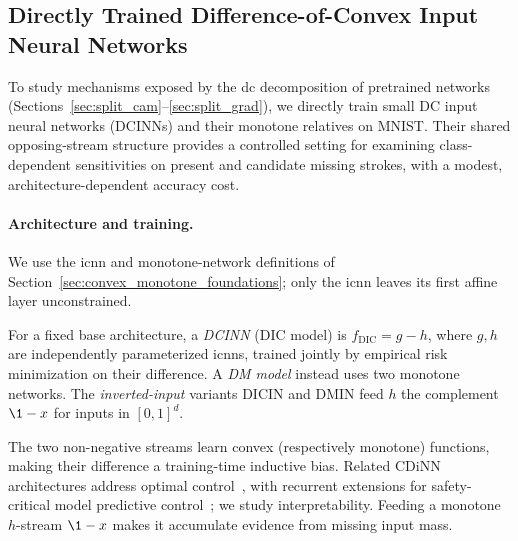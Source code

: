 \subsection{Directly Trained Difference-of-Convex Input Neural Networks}\label{sec:dcinns}

To study mechanisms exposed by the \ac{dc} decomposition of pretrained networks (Sections~\ref{sec:split_cam}--\ref{sec:split_grad}), we directly train small DC input neural networks (DCINNs) and their monotone relatives on MNIST. Their shared opposing-stream structure provides a controlled setting for examining class-dependent sensitivities on present and candidate missing strokes, with a modest, architecture-dependent accuracy cost.

\paragraph{Architecture and training.}\label{subsec:dcinn_architecture}

We use the \ac{icnn} and monotone-network definitions of Section~\ref{sec:convex_monotone_foundations}; only the \ac{icnn} leaves its first affine layer unconstrained.

\begin{definition}\label{def:dcinn}
For a fixed base architecture, a \emph{DCINN} (DIC model) is $f_{\mathrm{DIC}}=g-h$, where $g,h$ are independently parameterized \acp{icnn}, trained jointly by empirical risk minimization on their difference. A \emph{DM model} instead uses two monotone networks. The \emph{inverted-input} variants DICIN and DMIN feed $h$ the complement $\1-x$ for inputs in $[0,1]^d$.
\end{definition}

The two non-negative streams learn convex (respectively monotone) functions, making their difference a training-time inductive bias. Related CDiNN architectures address optimal control~\parencite{Sankaranarayanan2021CDINN}, with recurrent extensions for safety-critical model predictive control~\parencite{Chen2025_RCDiNN}; we study interpretability. Feeding a monotone $h$-stream $\1-x$ makes it accumulate evidence from missing input mass.

